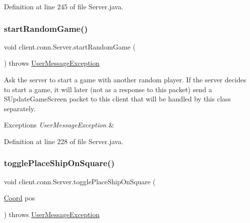 Definition at line 245 of file Server.\+java.

\hypertarget{classclient_1_1conn_1_1_server_afbeea330d5f40a6edd87387fa71bcc2d}{}\label{classclient_1_1conn_1_1_server_afbeea330d5f40a6edd87387fa71bcc2d} 
\subsubsection{\texorpdfstring{start\+Random\+Game()}{startRandomGame()}}
{\footnotesize\ttfamily void client.\+conn.\+Server.\+start\+Random\+Game (\begin{DoxyParamCaption}{ }\end{DoxyParamCaption}) throws \hyperlink{classpt_1_1up_1_1fe_1_1lpro1613_1_1sharedlib_1_1exceptions_1_1_user_message_exception}{User\+Message\+Exception}}

Ask the server to start a game with another random player. If the server decides to start a game, it will later (not as a response to this packet) send a S\+Update\+Game\+Screen packet to this client that will be handled by this class separately. 
\begin{DoxyExceptions}{Exceptions}
{\em User\+Message\+Exception} & \\
\hline
\end{DoxyExceptions}


Definition at line 228 of file Server.\+java.

\hypertarget{classclient_1_1conn_1_1_server_a9894c54137e6f203dd38a47fe3514c27}{}\label{classclient_1_1conn_1_1_server_a9894c54137e6f203dd38a47fe3514c27} 
\subsubsection{\texorpdfstring{toggle\+Place\+Ship\+On\+Square()}{togglePlaceShipOnSquare()}}
{\footnotesize\ttfamily void client.\+conn.\+Server.\+toggle\+Place\+Ship\+On\+Square (\begin{DoxyParamCaption}\item[{\hyperlink{classpt_1_1up_1_1fe_1_1lpro1613_1_1sharedlib_1_1utils_1_1_coord}{Coord}}]{pos }\end{DoxyParamCaption}) throws \hyperlink{classpt_1_1up_1_1fe_1_1lpro1613_1_1sharedlib_1_1exceptions_1_1_user_message_exception}{User\+Message\+Exception}}

